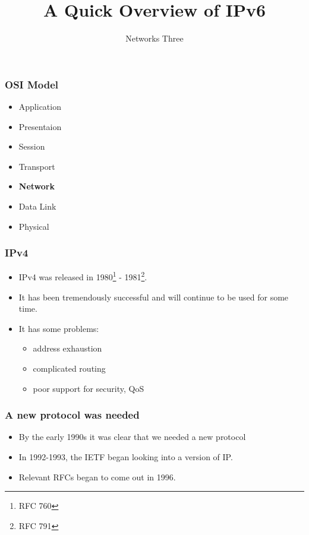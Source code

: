 \documentclass[10pt]{beamer}
\title{A Quick Overview of IPv6}
\author[IN715]{Networks Three}
\institute[Otago Polytechnic]{
  Otago Polytechnic \\
  Dunedin, New Zealand \\
}
\date{}
\begin{document}
\begin{frame}[plain]
  \titlepage
\end{frame}



\begin{frame}
  \frametitle{OSI Model}

 \begin{itemize}
  \item Application
  \item Presentaion
  \item Session
  \item Transport
  \item \textbf{Network}
  \item Data Link
  \item Physical
 \end{itemize}

\end{frame}

\begin{frame}
  \frametitle{IPv4}

 \begin{itemize}
  \item IPv4 was released in 1980\footnote{RFC 760} - 1981\footnote{RFC 791}.
  \item It has been tremendously successful and will continue to be used for some time.
  \item It has some problems:
    \begin{itemize}
      \item address exhaustion
      \item complicated routing
      \item poor support for security, QoS
    \end{itemize}
 \end{itemize}

\end{frame}


\begin{frame}
  \frametitle{A new protocol was needed}

 \begin{itemize}
  \item By the early 1990s it was clear that we needed a new protocol
  \item In 1992-1993, the IETF began looking into a version of IP.
  \item Relevant RFCs began to come out in 1996.
 \end{itemize}

\end{frame}
\end{document}
